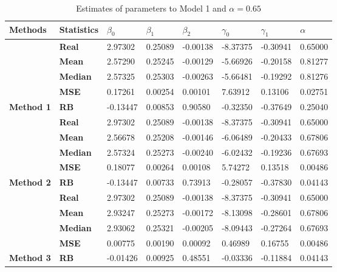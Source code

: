 \begin{table}[h]

\caption{\label{tab:Est_model_1_Alpha0.65}Estimates of parameters to Model 1 and $\alpha=0.65$}
\centering
\begin{tabular}[t]{>{}l>{}lllllll}
\toprule
Methods & Statistics & $\beta_0$ & $\beta_1$ & $\beta_2$ & $\gamma_0$ & $\gamma_1$ & $\alpha$\\
\midrule
 & \textbf{Real} & 2.97302 & 0.25089 & -0.00138 & -8.37375 & -0.30941 & 0.65000\\
\cmidrule{2-8}
 & \textbf{Mean} & 2.57290 & 0.25245 & -0.00129 & -5.66926 & -0.20158 & 0.81277\\
\cmidrule{2-8}
 & \textbf{Median} & 2.57325 & 0.25303 & -0.00263 & -5.66481 & -0.19292 & 0.81276\\
\cmidrule{2-8}
 & \textbf{MSE} & 0.17261 & 0.00254 & 0.00101 & 7.63912 & 0.13106 & 0.02751\\
\cmidrule{2-8}
\multirow{-5}{*}{\raggedright\arraybackslash \textbf{Method 1}} & \textbf{RB} & -0.13447 & 0.00853 & 0.90580 & -0.32350 & -0.37649 & 0.25040\\
\cmidrule{1-8}
 & \textbf{Real} & 2.97302 & 0.25089 & -0.00138 & -8.37375 & -0.30941 & 0.65000\\
\cmidrule{2-8}
 & \textbf{Mean} & 2.56678 & 0.25208 & -0.00146 & -6.06489 & -0.20433 & 0.67806\\
\cmidrule{2-8}
 & \textbf{Median} & 2.57324 & 0.25273 & -0.00240 & -6.02432 & -0.19236 & 0.67693\\
\cmidrule{2-8}
 & \textbf{MSE} & 0.18077 & 0.00264 & 0.00108 & 5.74272 & 0.13518 & 0.00486\\
\cmidrule{2-8}
\multirow{-5}{*}{\raggedright\arraybackslash \textbf{Method 2}} & \textbf{RB} & -0.13447 & 0.00733 & 0.73913 & -0.28057 & -0.37830 & 0.04143\\
\cmidrule{1-8}
 & \textbf{Real} & 2.97302 & 0.25089 & -0.00138 & -8.37375 & -0.30941 & 0.65000\\
\cmidrule{2-8}
 & \textbf{Mean} & 2.93247 & 0.25273 & -0.00172 & -8.13098 & -0.28601 & 0.67806\\
\cmidrule{2-8}
 & \textbf{Median} & 2.93062 & 0.25321 & -0.00205 & -8.09443 & -0.27264 & 0.67693\\
\cmidrule{2-8}
 & \textbf{MSE} & 0.00775 & 0.00190 & 0.00092 & 0.46989 & 0.16755 & 0.00486\\
\cmidrule{2-8}
\multirow{-5}{*}{\raggedright\arraybackslash \textbf{Method 3}} & \textbf{RB} & -0.01426 & 0.00925 & 0.48551 & -0.03336 & -0.11884 & 0.04143\\
\bottomrule
\end{tabular}
\end{table}
